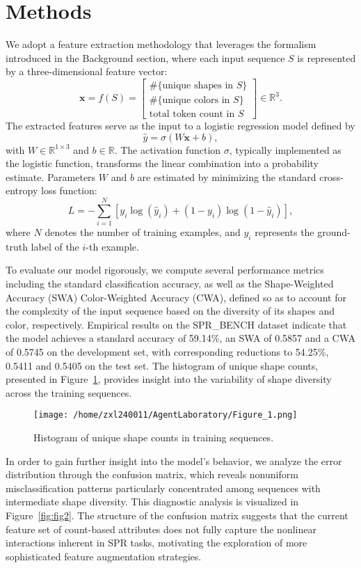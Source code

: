 \documentclass{article}
\begin{document}
\section{Methods}
We adopt a feature extraction methodology that leverages the formalism introduced in the Background section, where each input sequence \(S\) is represented by a three-dimensional feature vector:
\[
\mathbf{x} = f(S) = \begin{bmatrix} \#\{\text{unique shapes in } S\} \\ \#\{\text{unique colors in } S\} \\ \text{total token count in } S \end{bmatrix} \in \mathbb{R}^3.
\]
The extracted features serve as the input to a logistic regression model defined by
\[
\hat{y} = \sigma(W\mathbf{x} + b),
\]
with \(W \in \mathbb{R}^{1 \times 3}\) and \(b \in \mathbb{R}\). The activation function \(\sigma\), typically implemented as the logistic function, transforms the linear combination into a probability estimate. Parameters \(W\) and \(b\) are estimated by minimizing the standard cross-entropy loss function:
\[
L = -\sum_{i=1}^{N}\left[y_i \log(\hat{y}_i) + (1-y_i)\log(1-\hat{y}_i)\right],
\]
where \(N\) denotes the number of training examples, and \(y_i\) represents the ground-truth label of the \(i\)-th example.

To evaluate our model rigorously, we compute several performance metrics including the standard classification accuracy, as well as the Shape-Weighted Accuracy (SWA) Color-Weighted Accuracy (CWA), defined so as to account for the complexity of the input sequence based on the diversity of its shapes and color, respectively. Empirical results on the SPR\_BENCH dataset indicate that the model achieves a standard accuracy of 59.14\%, an SWA of 0.5857 and a CWA of 0.5745 on the development set, with corresponding reductions to 54.25\%, 0.5411 and 0.5405 on the test set. The histogram of unique shape counts, presented in Figure~\ref{fig:fig1}, provides insight into the variability of shape diversity across the training sequences.

\begin{figure}[h]
\caption{Histogram of unique shape counts in training sequences.}
\centering
\texttt{[image: /home/zxl240011/AgentLaboratory/Figure\_1.png]}
\label{fig:fig1}
\end{figure}

In order to gain further insight into the model’s behavior, we analyze the error distribution through the confusion matrix, which reveals nonuniform misclassification patterns particularly concentrated among sequences with intermediate shape diversity. This diagnostic analysis is visualized in Figure~\ref{fig:fig2}. The structure of the confusion matrix suggests that the current feature set of count-based attributes does not fully capture the nonlinear interactions inherent in SPR tasks, motivating the exploration of more sophisticated feature augmentation strategies.
\end{document}
